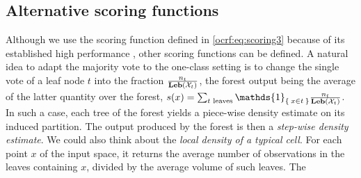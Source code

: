 \subsection{Alternative scoring functions}
\label{supp:scoring_functions}
Although we use the scoring function defined in \cref{ocrf:eq:scoring3} because
of its established high performance \citep{Liu2008}, other scoring functions
can be defined.
A natural idea to adapt the majority vote to the one-class setting is to change
the single vote of a leaf node $t$ into the fraction
$\frac{n_t}{\mathbf{Leb}(\mathcal{X}_t)}$, the forest output being the average of the
latter quantity over the forest,
$s(x) = \sum_{t \text{~leaves}} \mathds{1}_{\Set{x \in t}}
\frac{n_t}{\Leb(\mathcal{X}_t)}$.
In such a case, each tree of the forest yields a piece-wise density estimate on
its induced partition. 
The output produced by the forest is then a \emph{step-wise density estimate}.
%
We could also think about the \emph{local density of a typical cell}.  For each
point $x$ of the input space, it returns the average number of observations in
the leaves containing $x$, divided by the average volume of such leaves.  The
